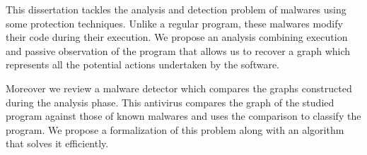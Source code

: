 This dissertation tackles the analysis and detection problem of malwares using some protection techniques.
Unlike a regular program, these malwares modify their code during their execution.
We propose an analysis combining execution and passive observation of the program that allows us to recover a graph which represents all the potential actions undertaken by the software.

Moreover we review a malware detector which compares the graphs constructed during the analysis phase. 
This antivirus compares the graph of the studied program against those of known malwares and uses the comparison to classify the program.
We propose a formalization of this problem along with an algorithm that solves it efficiently.